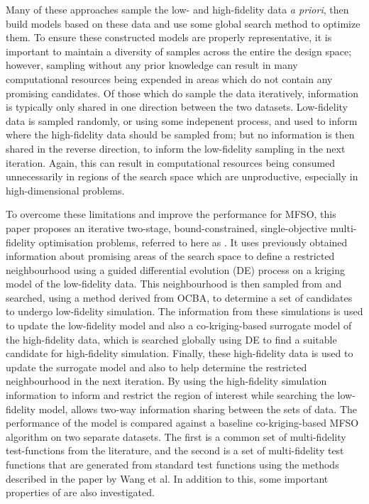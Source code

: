 Many of these approaches sample the low- and high-fidelity data \emph{a priori}, then build models based on these data and use some global search method to optimize them. To ensure these constructed models are properly representative, it is important to maintain a diversity of samples across the entire the design space; however, sampling without any prior knowledge can result in many computational resources being expended in areas which do not contain any promising candidates. Of those which do sample the data iteratively, information is typically only shared in one direction between the two datasets. Low-fidelity data is sampled randomly, or using some indepenent process, and used to inform where the high-fidelity data should be sampled from; but no information is then shared in the reverse direction, to inform the low-fidelity sampling in the next iteration. Again, this can result in computational resources being consumed unnecessarily in regions of the search space which are unproductive, especially in high-dimensional problems. 


To overcome these limitations and improve the performance for MFSO, this paper proposes an iterative two-stage, bound-constrained, single-objective multi-fidelity optimisation problems, referred to here as \AlgName{}. It uses previously obtained information about promising areas of the search space to define a restricted neighbourhood using a guided differential evolution (DE) process on a kriging model of the low-fidelity data. This neighbourhood is then sampled from and searched, using a method derived from OCBA, to determine a set of candidates to undergo low-fidelity simulation. The information from these simulations is used to update the low-fidelity model and also a co-kriging-based surrogate model of the high-fidelity data, which is searched globally using DE to find a suitable candidate for high-fidelity simulation. Finally, these high-fidelity data is used to update the surrogate model and also to help determine the restricted neighbourhood in the next iteration. By using the high-fidelity simulation information to inform and restrict the region of interest while searching the low-fidelity model, \AlgName{} allows two-way information sharing between the sets of data. The performance of the \AlgName{} model is compared against a baseline co-kriging-based MFSO algorithm on two separate datasets. The first is a common set of multi-fidelity test-functions from the literature, and the second is a set of multi-fidelity test functions that are generated from standard test functions using the methods described in the paper by Wang et al. In addition to this, some important properties of \AlgName{} are also investigated.

